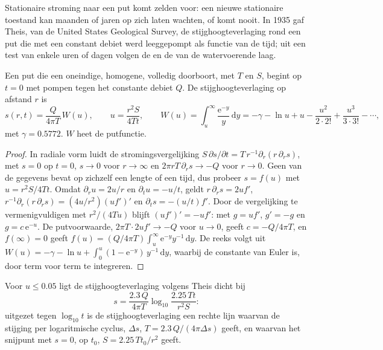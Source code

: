 Stationaire stroming naar een put komt zelden voor: een nieuwe stationaire toestand kan maanden of
jaren op zich laten wachten, of komt nooit. In 1935 gaf Theis, van de United States Geological
Survey, de stijghoogteverlaging rond een put die met een constant debiet werd leeggepompt als
functie van de tijd; uit een test van enkele uren of dagen volgen de  en de
 van de watervoerende laag.

\begin{theorem}\label{thm:b3:hydrogeology:theis}
Een put die een oneindige, homogene,  volledig doorboort, met
 $T$ en  $S$, begint op $t = 0$ met pompen tegen het
constante debiet $Q$. De stijghoogteverlaging op afstand $r$ is
\[
s(r, t) = \frac{Q}{4\pi T}\,W(u), \qquad u = \frac{r^2S}{4Tt}, \qquad
W(u) = \int_u^\infty\frac{\mathrm e^{-y}}{y}\,\mathrm dy = -\gamma - \ln u +
u - \frac{u^2}{2\cdot2!} + \frac{u^3}{3\cdot3!} - \cdots,
\]
met $\gamma = \num{0.5772}$. $W$ heet de putfunctie.
\end{theorem}

\begin{proof}
In radiale vorm luidt de stromingsvergelijking $S\,\partial s/\partial t =
T\,r^{-1}\partial_r(r\,\partial_rs)$, met $s = 0$ op $t = 0$, $s \to 0$ voor
$r \to \infty$ en $2\pi rT\,\partial_rs \to -Q$ voor $r \to 0$. Geen van de
gegevens bevat op zichzelf een lengte of een tijd, dus probeer $s = f(u)$ met $u =
r^2S/4Tt$. Omdat $\partial_ru = 2u/r$ en $\partial_tu = -u/t$, geldt $r\,\partial_rs =
2uf'$, $r^{-1}\partial_r(r\,\partial_rs) = (4u/r^2)(uf')'$ en $\partial_ts =
-(u/t)f'$. Door de vergelijking te vermenigvuldigen met $r^2/(4Tu)$ blijft $(uf')' = -uf'$:
met $g = uf'$, $g' = -g$ en $g = c\,\mathrm e^{-u}$. De putvoorwaarde, $2\pi T\cdot2uf' \to -Q$ voor $u \to 0$, geeft $c =
-Q/4\pi T$, en $f(\infty) = 0$ geeft $f(u) = (Q/4\pi T)\int_u^\infty
\mathrm e^{-y}y^{-1}\,\mathrm dy$. De reeks volgt uit
$W(u) = -\gamma - \ln u + \int_0^u(1 - \mathrm e^{-y})\,y^{-1}\,\mathrm dy$,
waarbij de constante van Euler is, door term voor term te integreren.
\end{proof}

\begin{proposition}\label{prop:b3:hydrogeology:cooper-jacob}
Voor $u \le 0.05$ ligt de stijghoogteverlaging volgens Theis dicht bij
\[
s = \frac{2.3\,Q}{4\pi T}\log_{10}\frac{2.25\,Tt}{r^2S} :
\]
uitgezet tegen $\log_{10}t$ is de stijghoogteverlaging een rechte lijn waarvan de stijging per
logaritmische cyclus, $\Delta s$, $T = 2.3\,Q/(4\pi\Delta s)$ geeft, en waarvan
het snijpunt met $s = 0$, op $t_0$, $S = 2.25\,Tt_0/r^2$ geeft.
\end{proposition}

